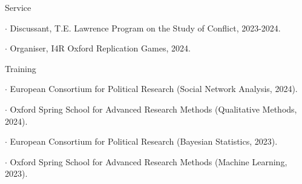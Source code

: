 \documentclass[10pt]{resume} %
\begin{document}
	\begin{rSection}{Service} \itemsep -5pt
		\item $\cdot$ Discussant, T.E. Lawrence Program on the Study of Conflict, 2023-2024.
		\item $\cdot$ Organiser, I4R Oxford Replication Games, 2024.
	\end{rSection}

	\begin{rSection}{Training} \itemsep -5pt
		
		\item $\cdot$ European Consortium for Political Research (Social Network Analysis, 2024).
    
    \item $\cdot$ Oxford Spring School for Advanced Research Methods (Qualitative Methods, 2024).
		
		\item $\cdot$ European Consortium for Political Research (Bayesian Statistics, 2023).
		
		\item $\cdot$ Oxford Spring School for Advanced Research Methods (Machine Learning, 2023).
	
	\end{rSection}
\end{document}
